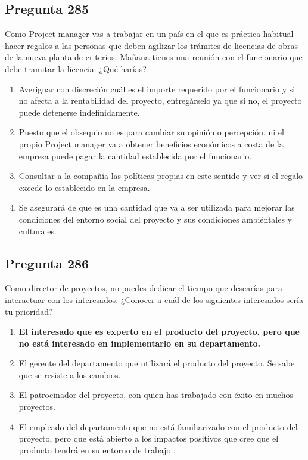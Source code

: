 \documentclass[11pt,a4paper]{article}
\begin{document}
\subsection*{Pregunta 285}
Como Project manager vas a trabajar en un país en el que es práctica habitual hacer regalos a las personas que deben agilizar los trámites de licencias de obras de la nueva planta de criterios. Mañana tienes una reunión con el funcionario que debe tramitar la licencia. ¿Qué harías?

\begin{enumerate}[label=\alph*)]
  \item Averiguar con discreción cuál es el importe requerido por el funcionario y si no afecta a la rentabilidad del proyecto, entregárselo ya que si no, el proyecto puede detenerse indefinidamente.
  \item Puesto que el obsequio no es para cambiar su opinión o percepción, ni el propio Project manager va a obtener beneficios económicos a costa de la empresa puede pagar la cantidad establecida por el funcionario.
  \item Consultar a la compañía las políticas propias en este sentido y ver si el regalo excede lo establecido en la empresa.
  \item Se asegurará de que es una cantidad que va a ser utilizada para mejorar las condiciones del entorno social del proyecto y sus condiciones ambiéntales y culturales.
\end{enumerate}

\subsection*{Pregunta 286}
Como director de proyectos, no puedes dedicar el tiempo que desearías para interactuar con los interesados. ¿Conocer a cuál de los siguientes interesados sería tu prioridad?

\begin{enumerate}[label=\alph*)]
  \item \textbf{El interesado que es experto en el producto del proyecto, pero que no está interesado en implementarlo en su departamento.}
  \item El gerente del departamento que utilizará el producto del proyecto. Se sabe que se resiste a los cambios.
  \item El patrocinador del proyecto, con quien has trabajado con éxito en muchos proyectos.
  \item El empleado del departamento que no está familiarizado con el producto del proyecto, pero que está abierto a los impactos positivos que cree que el producto tendrá en su entorno de trabajo .
\end{enumerate}
\end{document}
